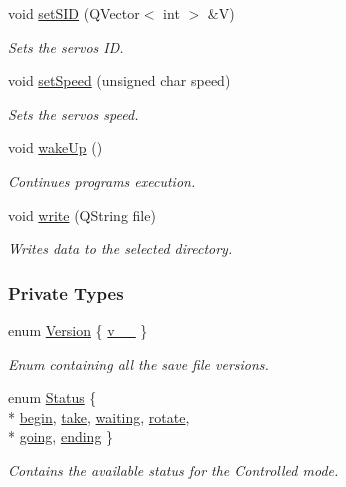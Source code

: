 \begin{DoxyCompactItemize}
void \hyperlink{a00009_ac3471e5020f5d9babd3f2ff7b3b82aca}{set\+S\+I\+D} (Q\+Vector$<$ int $>$ \&V)
\begin{DoxyCompactList}\small\item\em Sets the servos I\+D. \end{DoxyCompactList}\item 
void \hyperlink{a00009_a906ea2c67acbffb3e8dedabc03288992}{set\+Speed} (unsigned char speed)
\begin{DoxyCompactList}\small\item\em Sets the servos speed. \end{DoxyCompactList}\item 
void \hyperlink{a00009_a5f32574f843d76deffec45995028389b}{wake\+Up} ()
\begin{DoxyCompactList}\small\item\em Continues program\textquotesingle{}s execution. \end{DoxyCompactList}\item 
void \hyperlink{a00009_aca68fe85a100a052c4d41f0fa88cc152}{write} (Q\+String file)
\begin{DoxyCompactList}\small\item\em Writes data to the selected directory. \end{DoxyCompactList}\end{DoxyCompactItemize}
\subsubsection*{Private Types}
\begin{DoxyCompactItemize}
\item 
enum \hyperlink{a00009_aeccce0ac6a969e2ee7cbe91687e2d085}{Version} \{ \hyperlink{a00009_aeccce0ac6a969e2ee7cbe91687e2d085a319b6bf2cb120faeefbd0a5118ece7e3}{v\+\_\+\_}
 \}
\begin{DoxyCompactList}\small\item\em Enum containing all the save file versions. \end{DoxyCompactList}\item 
enum \hyperlink{a00009_a3c23985ab5e94c14f5e6fca0a9338f9c}{Status} \{ \\*
\hyperlink{a00009_a3c23985ab5e94c14f5e6fca0a9338f9ca1dad1d6f2c4b2b0a2eb62a938a9e7f51}{begin}, 
\hyperlink{a00009_a3c23985ab5e94c14f5e6fca0a9338f9caf04ef179dc6409795e9d3ade571c3515}{take}, 
\hyperlink{a00009_a3c23985ab5e94c14f5e6fca0a9338f9caaddba813e34d7dd76102738562a90054}{waiting}, 
\hyperlink{a00009_a3c23985ab5e94c14f5e6fca0a9338f9ca78f8ef8a596e79d3e778ef9052461658}{rotate}, 
\\*
\hyperlink{a00009_a3c23985ab5e94c14f5e6fca0a9338f9cac8deab3874847d5e02a4593a81de8ba3}{going}, 
\hyperlink{a00009_a3c23985ab5e94c14f5e6fca0a9338f9ca08a8e15b95d1cf505aab103927b3f832}{ending}
 \}
\begin{DoxyCompactList}\small\item\em Contains the available status for the Controlled mode. \end{DoxyCompactList}\end{DoxyCompactItemize}

